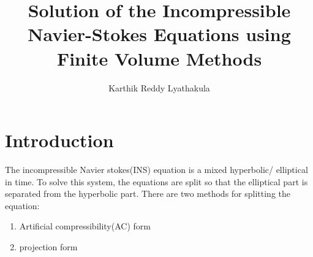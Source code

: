 \documentclass[12pt]{elsarticle}
\begin{document}
	
	\begin{frontmatter}
		
		
		
		\title{Solution of the Incompressible Navier-Stokes Equations using Finite Volume Methods}
		
		
		
		
		\author{Karthik Reddy Lyathakula}
		
		\address{North Carolina State University, Raleigh,  United States}
		
	\end{frontmatter}
	
	
	\section{Introduction}
	\label{S:1}
	
	The incompressible Navier stokes(INS) equation is a mixed hyperbolic/ elliptical in time. To solve this system, the equations are split so that the elliptical part is separated from the hyperbolic part. There are two methods for splitting the equation:
	
	\begin{enumerate}
		\item Artificial compressibility(AC) form
		\item projection form
	\end{enumerate}
	
\end{document}
